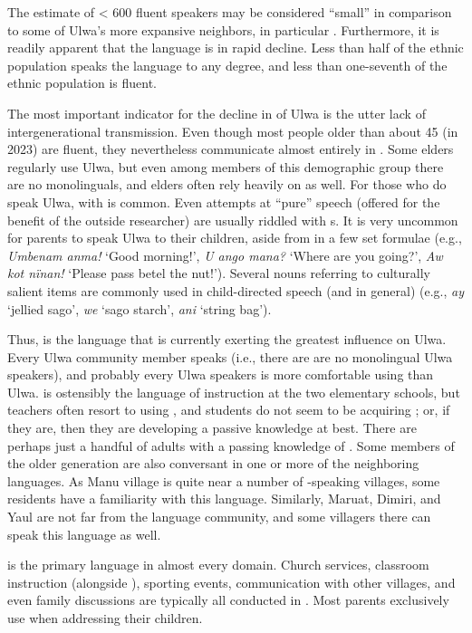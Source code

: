 The estimate of < 600 fluent speakers may be considered “small” in comparison to some of Ulwa’s more expansive neighbors, in particular . Furthermore, it is readily apparent that the language is in rapid decline. Less than half of the ethnic population speaks the language to any degree, and less than one-seventh of the ethnic population is fluent.

The most important indicator for the decline in  of Ulwa is the utter lack of intergenerational transmission. Even though most people older than about 45 (in 2023) are fluent, they nevertheless communicate almost entirely in . Some elders regularly use Ulwa, but even among members of this demographic group there are no monolinguals, and elders often rely heavily on  as well. For those who do speak Ulwa,  with  is common. Even attempts at “pure” speech (offered for the benefit of the outside researcher) are usually riddled with  s. It is very uncommon for parents to speak Ulwa to their children, aside from in a few set formulae (e.g., \textit{Umbenam anma!} ‘Good morning!’, \textit{U ango mana?} ‘Where are you going?’, \textit{Aw kot nïnan!} ‘Please pass betel the nut!’). Several nouns referring to culturally salient items are commonly used in child-directed speech (and in general) (e.g., \textit{ay} ‘jellied sago’, \textit{we} ‘sago starch’, \textit{ani} ‘string bag’).

Thus,  is the language that is currently exerting the greatest influence on Ulwa. Every Ulwa community member speaks  (i.e., there are are no monolingual Ulwa speakers), and probably every Ulwa speakers is more comfortable using  than Ulwa.  is ostensibly the language of instruction at the two elementary schools, but teachers often resort to using , and students do not seem to be acquiring ; or, if they are, then they are developing a passive knowledge at best. There are perhaps just a handful of adults with a passing knowledge of . Some members of the older generation are also conversant in one or more of the neighboring languages. As Manu village is quite near a number of -speaking villages, some residents have a familiarity with this language. Similarly, Maruat, Dimiri, and Yaul are not far from the  language community, and some villagers there can speak this language as well.

 is the primary language in almost every domain. Church services, classroom instruction (alongside ), sporting events, communication with other villages, and even family discussions are typically all conducted in . Most parents exclusively use  when addressing their children.


